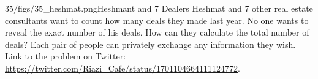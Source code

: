 \begin{problem}{35/figs/35_heshmat.png}{Heshmant and 7 Dealers}
Heshmat and 7 other real estate consultants want to count how many deals they made last year. No one wants to reveal the exact number of his deals. How can they calculate the total number of deals? Each pair of people can privately exchange any information they wish.\\[0.2cm]

Link to the problem on Twitter: \url{https://twitter.com/Riazi_Cafe/status/1701104664111124772}.
\end{problem}
